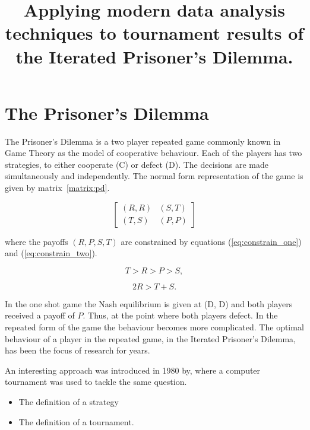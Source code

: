 \documentclass{article}
\title{Applying modern data analysis techniques to tournament results of the
Iterated Prisoner's Dilemma.}
\date{}
\begin{document}
\maketitle

\section{The Prisoner's Dilemma}

The Prisoner's Dilemma is a two player repeated game commonly known in Game Theory
as the model of cooperative behaviour. Each of the players has two strategies,
to either cooperate (C) or defect (D). The decisions are made simultaneously
and independently. The normal form representation of the game is given by
matrix~\ref{matrix:pd}.

\begin{equation}\label{matrix:pd}
    \begin{bmatrix}
    (R,R) & (S,T)  \\
    (T,S) & (P,P)
    \end{bmatrix}
\end{equation}

where the payoffs \((R, P, S, T)\) are constrained by equations (\ref{eq:constrain_one})
and (\ref{eq:constrain_two}).

\begin{equation}\label{eq:constrain_one}
    T > R > P > S,
\end{equation}

\begin{equation}\label{eq:constrain_two}
    2R > T + S.
\end{equation}

In the one shot game the Nash equilibrium is given at (D, D) and both players
received a payoff of \(P\). Thus, at the point where both players defect.
In the repeated form of the game the behaviour becomes more complicated. The optimal
behaviour of a player in the repeated game, in the Iterated Prisoner's Dilemma,
has been the focus of research for years.

An interesting approach was introduced in 1980 by, where a computer tournament
was used to tackle the same question.

\begin{itemize}
    \item The definition of a strategy
    \item The definition of a tournament.
\end{itemize}
\end{document}
